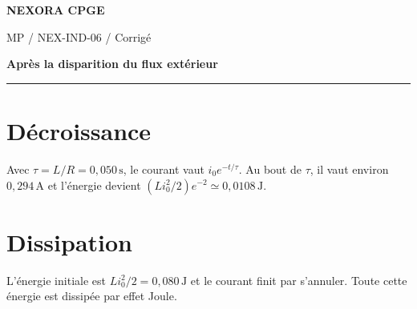 \documentclass[11pt,a4paper]{article}
\begin{document}
{\small\bfseries\color{nexorablue} NEXORA CPGE}\par
{\small MP / NEX-IND-06 / Corrigé}\par
{\LARGE\bfseries Après la disparition du flux extérieur}\par
\vspace{0.25em}\hrule\vspace{0.6em}

\section*{Décroissance}
Avec $\tau=L/R=0{,}050\,\mathrm s$, le courant vaut $i_0e^{-t/\tau}$. Au bout de $\tau$, il vaut environ $0{,}294\,\mathrm A$ et l’énergie devient $(Li_0^2/2)e^{-2}\simeq0{,}0108\,\mathrm J$.

\section*{Dissipation}
L’énergie initiale est $Li_0^2/2=0{,}080\,\mathrm J$ et le courant finit par s’annuler. Toute cette énergie est dissipée par effet Joule.
\end{document}
